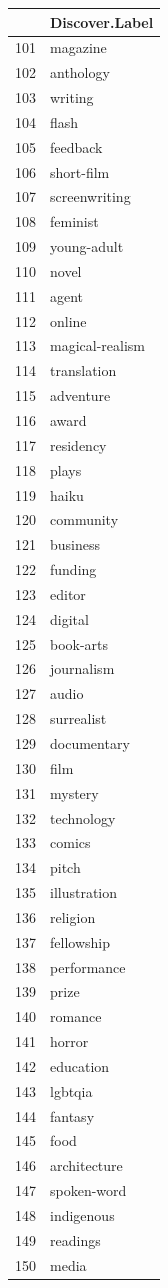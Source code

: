 \documentclass[]{report}   %
\begin{document}
\begin{minipage}{0.24\textwidth}
\begin{tabular}{rl}
  \hline
 & Discover.Label \\ 
  \hline
  101 & magazine \\ 
  102 & anthology \\ 
  103 & writing \\ 
  104 & flash \\ 
  105 & feedback \\ 
  106 & short-film \\ 
  107 & screenwriting \\ 
  108 & feminist \\ 
  109 & young-adult \\ 
  110 & novel \\ 
  111 & agent \\ 
  112 & online \\ 
  113 & magical-realism \\ 
  114 & translation \\ 
  115 & adventure \\ 
  116 & award \\ 
  117 & residency \\ 
  118 & plays \\ 
  119 & haiku \\ 
  120 & community \\ 
  121 & business \\ 
  122 & funding \\ 
  123 & editor \\ 
  124 & digital \\ 
  125 & book-arts \\ 
  126 & journalism \\ 
  127 & audio \\ 
  128 & surrealist \\ 
  129 & documentary \\ 
  130 & film \\ 
  131 & mystery \\ 
  132 & technology \\ 
  133 & comics \\ 
  134 & pitch \\ 
  135 & illustration \\ 
  136 & religion \\ 
  137 & fellowship \\ 
  138 & performance \\ 
  139 & prize \\ 
  140 & romance \\ 
  141 & horror \\ 
  142 & education \\ 
  143 & lgbtqia \\ 
  144 & fantasy \\ 
  145 & food \\ 
  146 & architecture \\ 
  147 & spoken-word \\ 
  148 & indigenous \\ 
  149 & readings \\ 
  150 & media \\ 
 \hline
\end{tabular}
    \end{minipage}
\end{document}
